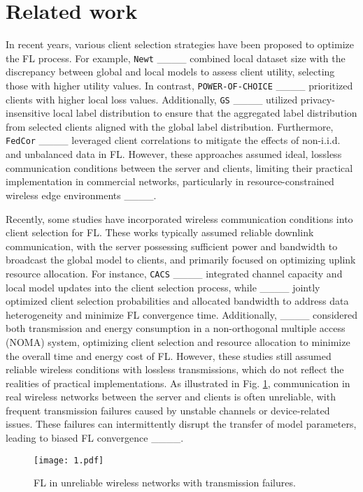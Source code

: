 \section{Related work}
In recent years, various client selection strategies have been proposed to optimize the FL process.
For example,
\texttt{Newt} ____ combined local dataset size with the discrepancy between global and local models to assess client utility, selecting those with higher utility values.
In contrast, \texttt{POWER-OF-CHOICE} ____ prioritized clients with higher local loss values.
Additionally, \texttt{GS} ____ utilized privacy-insensitive local label distribution to ensure that the aggregated label distribution from selected clients aligned with the global label distribution.
Furthermore, \texttt{FedCor} ____ leveraged client correlations to mitigate the effects of non-i.i.d. and unbalanced data in FL.
However, these approaches assumed ideal, lossless communication conditions between the server and clients,
limiting their practical implementation in commercial networks, particularly in resource-constrained wireless edge environments ____.

Recently, some studies have incorporated wireless communication conditions into client selection for FL.
These works typically assumed reliable downlink communication, with the server possessing sufficient power and bandwidth to broadcast the global model to clients, and primarily focused on optimizing uplink resource allocation.
For instance,
\texttt{CACS} ____ integrated channel capacity and local model updates into the client selection process, while ____ jointly optimized client selection probabilities and allocated bandwidth to address data heterogeneity and minimize FL convergence time.
Additionally, ____ considered both transmission and energy consumption in a non-orthogonal multiple access (NOMA) system, optimizing client selection and resource allocation to minimize the overall time and energy cost of FL.
However, these studies still assumed reliable wireless conditions with lossless transmissions, which do not reflect the realities of practical implementations.
As illustrated in Fig. \ref{fig:FL wireless networks}, communication in real wireless networks between the server and clients is often unreliable, with frequent transmission failures caused by unstable channels or device-related issues.
These failures can intermittently disrupt the transfer of model parameters, leading to biased FL convergence ____.

\begin{figure}[t]
\centering
\texttt{[image: 1.pdf]}
\caption{FL in unreliable wireless networks with transmission failures.}
\label{fig:FL wireless networks}
\end{figure}



